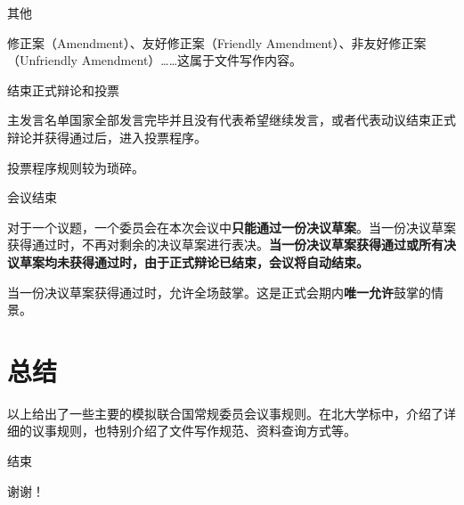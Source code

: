 \documentclass{beamer}
\begin{document}
\begin{frame}{其他}

修正案（Amendment）、友好修正案（Friendly Amendment）、非友好修正案（Unfriendly Amendment）……这属于文件写作内容。

\end{frame}

\begin{frame}{结束正式辩论和投票}

主发言名单国家全部发言完毕并且没有代表希望继续发言，或者代表动议结束正式辩论并获得通过后，进入投票程序。

投票程序规则较为琐碎。

\end{frame}

\begin{frame}{会议结束}

对于一个议题，一个委员会在本次会议中\textbf{只能通过一份决议草案}。当一份决议草案获得通过时，不再对剩余的决议草案进行表决。\textbf{当一份决议草案获得通过或所有决议草案均未获得通过时，由于正式辩论已结束，会议将自动结束。}

当一份决议草案获得通过时，允许全场鼓掌。这是正式会期内\textbf{唯一允许}鼓掌的情景。

\end{frame}

\section{总结}

\begin{frame}

以上给出了一些主要的模拟联合国常规委员会议事规则。在北大学标中，介绍了详细的议事规则，也特别介绍了文件写作规范、资料查询方式等。

\end{frame}

\begin{frame}{结束}

谢谢！

\end{frame}
\end{document}
